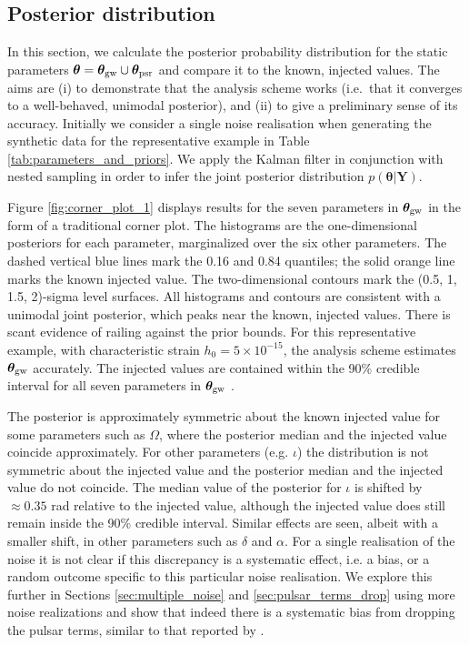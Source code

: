 \documentclass[fleqn,usenatbib,useAMS]{mnras}
\begin{document}
	
	\subsection{Posterior distribution}\label{sec:parameter_estim}
	In this section, we calculate the posterior probability distribution for the static parameters $\boldsymbol{\theta} = \boldsymbol{\theta}_{\rm gw} \cup \boldsymbol{\theta}_{\rm psr}$ and compare it to the known, injected values. The aims are (i) to demonstrate that the analysis scheme works (i.e.\ that it converges to a well-behaved, unimodal posterior), and (ii) to give a preliminary sense of its accuracy. Initially we consider a single noise realisation when generating the synthetic data for the representative example in Table \ref{tab:parameters_and_priors}. We apply the Kalman filter in conjunction with nested sampling in order to infer the joint posterior distribution $p({\boldsymbol{\theta}} | {\boldsymbol{Y}})$. \newline 
	
Figure \ref{fig:corner_plot_1} displays results for the seven parameters in  $\boldsymbol{\theta}_{\rm gw}$ in the form of a traditional corner plot. The histograms are the one-dimensional posteriors for each parameter, marginalized over the six other parameters. The dashed vertical blue lines mark the 0.16 and 0.84 quantiles; the solid orange line marks the known injected value. The two-dimensional contours mark the (0.5, 1, 1.5, 2)-sigma level surfaces. All histograms and contours are consistent with a unimodal joint posterior, which peaks near the known, injected values. There is scant evidence of railing against the prior bounds. For this representative example, with characteristic strain $h_0 = 5 \times 10^{-15}$, the analysis scheme estimates $\boldsymbol{\theta}_{\rm gw}$ accurately. The injected values are contained within the 90\% credible interval for all seven parameters in $\boldsymbol{\theta}_{\rm gw}$ . \newline 
 
 
The posterior is approximately symmetric about the known injected value for some parameters such as $\Omega$, where the posterior median and the injected value coincide approximately. For other parameters (e.g. $\iota$) the distribution is not symmetric about the injected value and the posterior median and the injected value do not coincide. The median value of the posterior for $\iota$ is shifted by $\approx 0.35$ rad relative to the injected value, although the injected value does still remain inside the 90\% credible interval. Similar effects are seen, albeit with a smaller shift, in other parameters such as $\delta$ and $\alpha$. For a single realisation of the noise it is not clear if this discrepancy is a systematic effect, i.e. a bias, or a random outcome specific to this particular noise realisation. We explore this further in Sections \ref{sec:multiple_noise} and \ref{sec:pulsar_terms_drop} using more noise realizations and show that indeed there is a systematic bias from dropping the pulsar terms, similar to that reported by \cite{Zhupulsarterms}. \newline 
\end{document}
